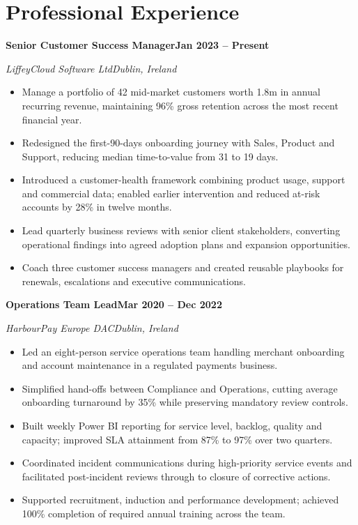 \documentclass[10pt,a4paper]{article}
\newcommand{\cvheading}[4]{%
  \needspace{4\baselineskip}%
  \textbf{#1}\hfill\textbf{#2}\par
  \textit{#3}\hfill\textit{#4}\par
}
\begin{document}
\section{Professional Experience}

\cvheading{Senior Customer Success Manager}{Jan 2023 -- Present}{LiffeyCloud Software Ltd}{Dublin, Ireland}
\begin{itemize}
  \item Manage a portfolio of 42 mid-market customers worth \texteuro1.8m in annual recurring revenue, maintaining 96\% gross retention across the most recent financial year.
  \item Redesigned the first-90-days onboarding journey with Sales, Product and Support, reducing median time-to-value from 31 to 19 days.
  \item Introduced a customer-health framework combining product usage, support and commercial data; enabled earlier intervention and reduced at-risk accounts by 28\% in twelve months.
  \item Lead quarterly business reviews with senior client stakeholders, converting operational findings into agreed adoption plans and expansion opportunities.
  \item Coach three customer success managers and created reusable playbooks for renewals, escalations and executive communications.
\end{itemize}

\cvheading{Operations Team Lead}{Mar 2020 -- Dec 2022}{HarbourPay Europe DAC}{Dublin, Ireland}
\begin{itemize}
  \item Led an eight-person service operations team handling merchant onboarding and account maintenance in a regulated payments business.
  \item Simplified hand-offs between Compliance and Operations, cutting average onboarding turnaround by 35\% while preserving mandatory review controls.
  \item Built weekly Power BI reporting for service level, backlog, quality and capacity; improved SLA attainment from 87\% to 97\% over two quarters.
  \item Coordinated incident communications during high-priority service events and facilitated post-incident reviews through to closure of corrective actions.
  \item Supported recruitment, induction and performance development; achieved 100\% completion of required annual training across the team.
\end{itemize}
\end{document}
